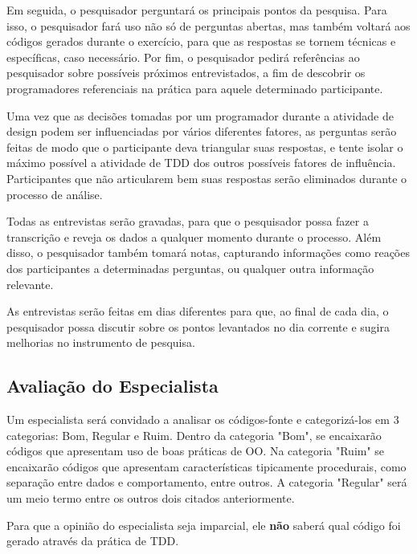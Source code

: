 Em seguida, o pesquisador perguntará os principais pontos da pesquisa.
Para isso, o pesquisador fará uso não só de perguntas abertas, mas também
voltará aos códigos gerados durante o exercício, para que as respostas se tornem técnicas e
específicas, caso necessário. 
Por fim, o pesquisador pedirá referências ao pesquisador sobre
possíveis próximos entrevistados, a fim de descobrir os programadores referenciais 
na prática para aquele determinado participante.

Uma vez que as decisões tomadas por um programador durante a atividade de design
podem ser influenciadas por vários diferentes fatores, 
as perguntas serão feitas de modo que o participante deva triangular suas respostas,
e tente isolar o máximo possível a atividade de TDD dos outros possíveis fatores
de influência. Participantes que não articularem bem suas respostas serão eliminados
durante o processo de análise.

Todas as entrevistas serão gravadas, para que o pesquisador possa fazer a
transcrição e reveja os dados a qualquer momento durante o processo. Além disso,
o pesquisador também tomará notas, capturando informações como reações dos 
participantes a determinadas perguntas, ou qualquer outra informação relevante. 

As entrevistas serão feitas em dias diferentes para que, ao final
de cada dia, o pesquisador possa discutir sobre os pontos levantados no dia
corrente e sugira melhorias no instrumento de pesquisa. 

\subsection{Avaliação do Especialista}
\label{sec:planejamento-especialista}

Um especialista será convidado a analisar os códigos-fonte e categorizá-los
em 3 categorias: Bom, Regular e Ruim. Dentro da categoria "Bom", se encaixarão códigos 
que apresentam uso de boas práticas de OO. Na categoria "Ruim" se encaixarão códigos
que apresentam características tipicamente procedurais, como separação entre
dados e comportamento, entre outros. A categoria "Regular" será um meio termo entre
os outros dois citados anteriormente.

Para que a opinião do especialista seja imparcial, ele \textbf{não} saberá qual código
foi gerado através da prática de TDD.

